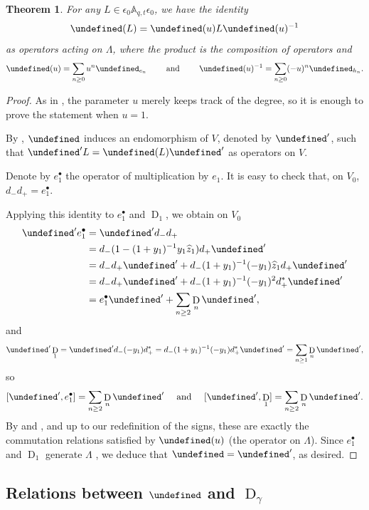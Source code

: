 \documentclass[reqno]{amsart}
\theoremstyle{plain}
\newtheorem{theorem}{Theorem}[section]
\theoremstyle{definition}
\theoremstyle{remark}
\DeclareMathOperator{\D}{D}
\newcommand{\A}{\mathbb{A}}%
\newcommand{\z}{\widehat{z}}
\let\oldTheta\Theta
\let\Theta\undefined
\DeclareMathOperator{\Theta}{\oldTheta}
\newcommand{\<}{\langle}
\renewcommand{\>}{\rangle}
\begin{document}
\begin{theorem}
    \label{thm:theta_e1_D1}
    For any $L \in \epsilon_0 \A_{q,t} \epsilon_0$, we have the identity
    \[ \Theta(L) = \Theta(u) L \Theta(u)^{-1} \]
    as operators acting on $\Lambda$, where the product is the composition of operators and
    \[ \Theta(u) = \sum_{n \geq 0} u^n \Theta_{e_n} \qquad \text{ and } \qquad \Theta(u)^{-1} = \sum_{n \geq 0} (-u)^n \Theta_{h_n}. \]
\end{theorem}

\begin{proof}
    As in , the parameter $u$ merely keeps track of the degree, so it is enough to prove the statement when $u=1$.

    By , $\Theta$ induces an endomorphism of $V$, denoted by $\Theta'$, such that $\Theta' L = \Theta(L) \Theta'$ as operators on $V$. 

    Denote by $e_1^\bullet$ the operator of multiplication by $e_1$. It is easy to check that, on $V_0$, $d_- d_+ = e_1^\bullet$.
    
    Applying this identity to $e_1^\bullet$ and $\D_1$, we obtain on $V_0$
    \begin{align*}
        \Theta' e_1^\bullet & = \Theta' d_- d_+ \\
        & = d_- (1 - (1+y_1)^{-1} y_1 \z_1) d_+ \Theta' \\
        & = d_- d_+ \Theta' + d_- (1+y_1)^{-1} (-y_1) \z_1 d_+ \Theta' \\
        & = d_- d_+ \Theta' + d_- (1+y_1)^{-1} (-y_1)^2 d_+^* \Theta' \\
        & = e_1^\bullet \Theta' + \sum_{n \geq 2} \D_n \Theta',
    \end{align*}
    and
    \[ \Theta' \D_1 = \Theta' d_- (-y_1) d_+^* = d_- (1+y_1)^{-1} (-y_1) d_+^* \Theta' = \sum_{n \geq 1} \D_n \Theta', \]
    so \[ [\Theta', e_1^\bullet] = \sum_{n \geq 2} \D_n \Theta' \quad \text{ and } \quad [\Theta', \D_1] = \sum_{n \geq 2} \D_n \Theta'. \]
    By \cite[Proposition~10.1]{DAdderioIraciVandenWyngaerd2021ThetaOperators} and \cite[Proposition~1.2]{Romero2022}, and up to our redefinition of the signs, these are exactly the commutation relations satisfied by $\Theta(u)$ (the operator on $\Lambda$). Since $e_1^\bullet$ and $\D_1$ generate $\Lambda$ \cite[Theorem~2.1]{GarsiaHaimanTesler1999ExplicitPlethysticFormulas}, we deduce that $\Theta = \Theta'$, as desired.
\end{proof}

\subsection{Relations between \texorpdfstring{$\Theta$}{Theta} and \texorpdfstring{$\D_\gamma$}{Dgamma}}
\label{section:theta_D}
\end{document}
